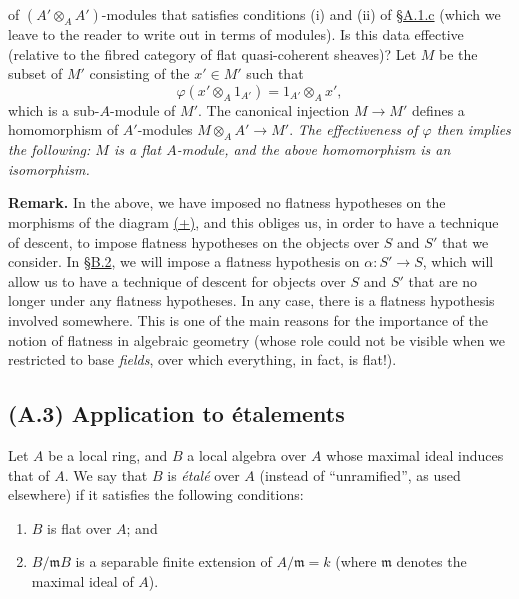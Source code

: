 \documentclass{article}
\providecommand{\tightlist}{%
  \setlength{\itemsep}{0pt}\setlength{\parskip}{0pt}}
\newenvironment{rmenv}[1]
  {\phantomsection\par\smallskip\noindent\textbf{#1.}\rmfamily}
  {\par\smallskip}
\newcommand{\oldpage}[1]{\marginpar{\footnotesize$\Big\vert$ \textit{p.~#1}}}
\theoremstyle{definition}
\theoremstyle{definition}
\theoremstyle{definition}
\theoremstyle{definition}
\theoremstyle{remark}
\begin{document}
of \((A'\otimes_A A')\)-modules that satisfies conditions (i) and (ii) of \protect\hyperlink{fga-3-i-section-A.1.c}{§A.1.c} (which we leave to the reader to write out in terms of modules).
Is this data effective (relative to the fibred category of flat quasi-coherent sheaves)?
Let \(M\) be the subset of \(M'\) consisting of the \(x'\in M'\) such that
\[
  \varphi(x'\otimes_A 1_{A'}) = 1_{A'}\otimes_A x',
\]
which is a sub-\(A\)-module of \(M'\).
The canonical injection \(M\to M'\) defines a homomorphism of \(A'\)-modules \(M\otimes_A A'\to M'\).
\emph{The effectiveness of \(\varphi\) then implies the following: \(M\) is a flat \(A\)-module, and the above homomorphism is an isomorphism.}

\begin{rmenv}{Remark}
In the above, we have imposed no flatness hypotheses on the morphisms of the diagram \protect\hyperlink{fga-3-i-section-A.2.b-equation}{(+)}, and this obliges us, in order to have a technique of descent, to impose flatness hypotheses on the objects over \(S\) and \(S'\) that we consider.
In \protect\hyperlink{fga-3-i-section-B.2}{§B.2}, we will impose a flatness hypothesis on \(\alpha\colon S'\to S\), which will allow us to have a technique of descent for objects over \(S\) and \(S'\) that are no longer under any flatness hypotheses.
In any case, there is a flatness hypothesis involved somewhere.
This is one of the main reasons for the importance of the notion of flatness in algebraic geometry (whose role could not be visible when we restricted to base \emph{fields}, over which everything, in fact, is flat!).

\end{rmenv}

\hypertarget{fga-3-i-section-A.3}{%
\subsection{(A.3) Application to étalements}\label{fga-3-i-section-A.3}}

Let \(A\) be a local ring, and \(B\) a local algebra over \(A\) whose maximal ideal induces that of \(A\).
\oldpage{190-10}We say that \(B\) is \emph{étalé} over \(A\) (instead of ``unramified'', as used elsewhere) if it satisfies the following conditions:

\begin{enumerate}
\def\labelenumi{\roman{enumi}.}
\tightlist
\item
  \(B\) is flat over \(A\); and
\item
  \(B/{\mathfrak{m}}B\) is a separable finite extension of \(A/{\mathfrak{m}}=k\) (where \({\mathfrak{m}}\) denotes the maximal ideal of \(A\)).
\end{enumerate}
\end{document}
